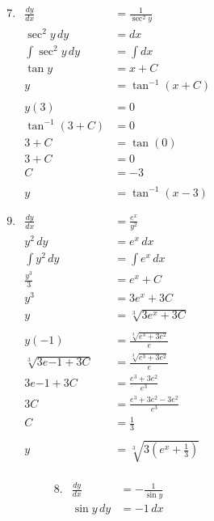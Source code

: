 \documentclass[12pt]{article}
\begin{document}
\begin{multicols}{2}
    \vspace*{-32pt}
    \begin{align*}
        &7.& \frac{dy}{dx} &= \frac{1}{\sec^2\! y} \\
        &&\sec^2\! y\,dy &= dx \\
        &&\int \sec^2\!y\,dy &= \int dx \\
        &&\tan y &= x + C \\
        &&y &= \tan^{-1}(x + C) \\ \\
        &&y(3) &= 0 \\ 
        &&\tan^{-1}(3 + C) &= 0 \\
        &&3+C &= \tan(0) \\
        &&3 + C &= 0 \\
        &&C &= -3 \\ \\
        &&y &= \tan^{-1}(x - 3)  \\ \\ \\
        &9.&\frac{dy}{dx} &= \frac{e^x}{y^2} \\
        &&y^2\,dy &= e^x\,dx \\
        &&\int y^2\,dy &= \int e^x\,dx \\
        &&\frac{y^3}{3} &= e^x + C \\
        &&y^3 &= 3e^x + 3C \\
        &&y &= \sqrt[3]{3e^x + 3C} \\ \\
        &&y(-1) &= \frac{\sqrt[3]{e^3 + 3e^2}}{e} \\
        &&\sqrt[3]{3e{-1} + 3C} &= \frac{\sqrt[3]{e^3 + 3e^2}}{e} \\
        &&3e{-1} + 3C &= \frac{e^3 + 3e^2}{e^3} \\
        &&3C &= \frac{e^3 + 3e^2 - 3e^2}{e^3} \\
        &&C &= \frac{1}{3} \\ \\
        &&y &= \sqrt[3]{3\left(e^x + \frac{1}{3}\right)} \\ \\ \\ 
    \end{align*}
    \columnbreak
    \begin{align*}
        &8.&\frac{dy}{dx} &= -\frac{1}{\sin y} \\
        &&\sin \! y\,dy &= -1\,dx \\

\end{align*}
\end{multicols}
\end{document}
